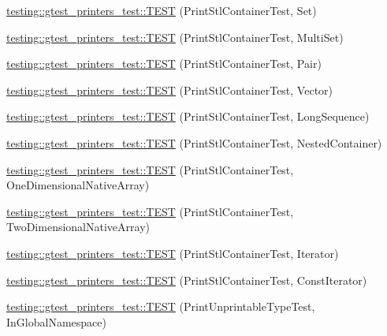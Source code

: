 \begin{DoxyCompactItemize}
\item 
\mbox{\hyperlink{namespacetesting_1_1gtest__printers__test_abdc498462741033074f8e86b7c0bd480}{testing\+::gtest\+\_\+printers\+\_\+test\+::\+T\+E\+ST}} (Print\+Stl\+Container\+Test, Set)
\item 
\mbox{\hyperlink{namespacetesting_1_1gtest__printers__test_adaa3e1cfa3feca377b3958edb41fc0f1}{testing\+::gtest\+\_\+printers\+\_\+test\+::\+T\+E\+ST}} (Print\+Stl\+Container\+Test, Multi\+Set)
\item 
\mbox{\hyperlink{namespacetesting_1_1gtest__printers__test_ad5d3e873b00c1c9e3f5924e106dd7831}{testing\+::gtest\+\_\+printers\+\_\+test\+::\+T\+E\+ST}} (Print\+Stl\+Container\+Test, Pair)
\item 
\mbox{\hyperlink{namespacetesting_1_1gtest__printers__test_abfab1ea62f0285c0cdbcca500be0dac8}{testing\+::gtest\+\_\+printers\+\_\+test\+::\+T\+E\+ST}} (Print\+Stl\+Container\+Test, Vector)
\item 
\mbox{\hyperlink{namespacetesting_1_1gtest__printers__test_a55eca253f3365ad26183bcc711cb257a}{testing\+::gtest\+\_\+printers\+\_\+test\+::\+T\+E\+ST}} (Print\+Stl\+Container\+Test, Long\+Sequence)
\item 
\mbox{\hyperlink{namespacetesting_1_1gtest__printers__test_ad8fb463805baecdfb95154dec6ec4f27}{testing\+::gtest\+\_\+printers\+\_\+test\+::\+T\+E\+ST}} (Print\+Stl\+Container\+Test, Nested\+Container)
\item 
\mbox{\hyperlink{namespacetesting_1_1gtest__printers__test_a6dd59bbdea483f662fe62e2c55c106ce}{testing\+::gtest\+\_\+printers\+\_\+test\+::\+T\+E\+ST}} (Print\+Stl\+Container\+Test, One\+Dimensional\+Native\+Array)
\item 
\mbox{\hyperlink{namespacetesting_1_1gtest__printers__test_aca371c218e2248562ed258eaf385f4d1}{testing\+::gtest\+\_\+printers\+\_\+test\+::\+T\+E\+ST}} (Print\+Stl\+Container\+Test, Two\+Dimensional\+Native\+Array)
\item 
\mbox{\hyperlink{namespacetesting_1_1gtest__printers__test_a01ec32faf0032f9fbcf4895d8d6e4aa9}{testing\+::gtest\+\_\+printers\+\_\+test\+::\+T\+E\+ST}} (Print\+Stl\+Container\+Test, Iterator)
\item 
\mbox{\hyperlink{namespacetesting_1_1gtest__printers__test_a3b54f9a039804190b7ff2e818169c0f2}{testing\+::gtest\+\_\+printers\+\_\+test\+::\+T\+E\+ST}} (Print\+Stl\+Container\+Test, Const\+Iterator)
\item 
\mbox{\hyperlink{namespacetesting_1_1gtest__printers__test_a805264fd24de8e65cba977a798abc54c}{testing\+::gtest\+\_\+printers\+\_\+test\+::\+T\+E\+ST}} (Print\+Unprintable\+Type\+Test, In\+Global\+Namespace)

\end{DoxyCompactItemize}

